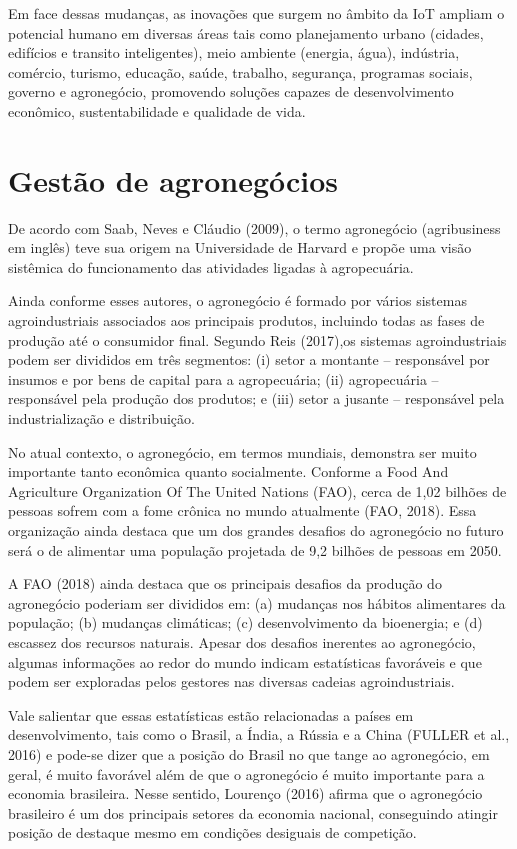 \documentclass[eso]{bcc}
\begin{document}
Em face dessas mudanças, as inovações que surgem no âmbito da IoT ampliam o potencial humano 
em diversas áreas tais como planejamento urbano (cidades, edifícios e transito inteligentes), 
meio ambiente (energia, água), indústria, comércio, turismo, educação, saúde, trabalho, 
segurança, programas sociais, governo e agronegócio, promovendo soluções capazes de 
desenvolvimento econômico, sustentabilidade e qualidade de vida.

\section{Gestão de agronegócios}
De acordo com Saab, Neves e Cláudio (2009), o termo agronegócio (agribusiness em inglês) teve 
sua origem na Universidade de Harvard e propõe uma visão sistêmica do funcionamento das atividades 
ligadas à agropecuária.

Ainda conforme esses autores, o agronegócio é formado por vários sistemas agroindustriais  
associados  aos  principais  produtos,  incluindo  todas  as  fases  de  produção até o 
consumidor final. Segundo Reis (2017),os sistemas agroindustriais podem ser divididos em 
três segmentos: (i) setor a montante – responsável por insumos e por bens de capital para a agropecuária; 
(ii) agropecuária – responsável pela produção dos produtos; e 
(iii) setor a jusante – responsável pela industrialização e distribuição.

No atual contexto, o agronegócio, em termos mundiais, demonstra ser muito importante tanto 
econômica quanto socialmente. Conforme a Food And Agriculture Organization Of The United Nations (FAO), 
cerca de 1,02 bilhões de pessoas sofrem com a fome crônica no mundo atualmente (FAO, 2018). 
Essa organização ainda destaca que um dos grandes desafios do agronegócio no futuro será o de 
alimentar uma população projetada de 9,2 bilhões de pessoas em 2050.

A FAO (2018) ainda destaca que os principais desafios da produção do agronegócio poderiam ser 
divididos em: (a) mudanças nos hábitos alimentares da população; (b) mudanças climáticas; 
(c) desenvolvimento da bioenergia; e (d) escassez dos recursos naturais. Apesar dos desafios 
inerentes ao agronegócio, algumas informações ao redor do mundo indicam estatísticas favoráveis 
e que podem ser exploradas pelos gestores nas diversas cadeias agroindustriais.

Vale salientar que essas estatísticas estão relacionadas a países em desenvolvimento, 
tais como o Brasil, a Índia, a Rússia e a China (FULLER et al., 2016) e pode-se dizer que a 
posição do Brasil no que tange ao agronegócio, em geral, é muito favorável além de que o 
agronegócio é muito importante para a economia brasileira. Nesse sentido, Lourenço (2016) 
afirma que o agronegócio brasileiro é um dos principais setores da economia nacional, conseguindo 
atingir posição  de  destaque  mesmo  em  condições  desiguais  de  competição.
\end{document}
